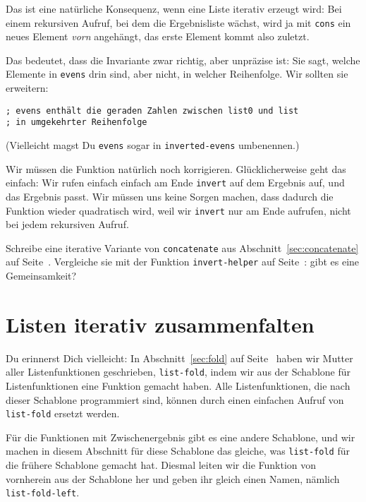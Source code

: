 Das ist eine natürliche Konsequenz, wenn eine Liste iterativ erzeugt
wird: Bei einem rekursiven Aufruf, bei dem die Ergebnisliste wächst,
wird ja mit \lstinline{cons} ein neues Element \emph{vorn} angehängt,
das erste Element kommt also zuletzt.

Das bedeutet, dass die Invariante zwar richtig, aber unpräzise ist:
Sie sagt, welche Elemente in \lstinline{evens} drin sind, aber nicht,
in welcher Reihenfolge.  Wir sollten sie erweitern:
%
\begin{lstlisting}
; evens enthält die geraden Zahlen zwischen list0 und list
; in umgekehrter Reihenfolge
\end{lstlisting}
%
(Vielleicht magst Du \lstinline{evens} sogar in
\lstinline{inverted-evens} umbenennen.)

Wir müssen die Funktion natürlich noch korrigieren.  Glücklicherweise geht das
einfach: Wir rufen einfach einfach am Ende \lstinline{invert} auf dem
Ergebnis auf, und das Ergebnis passt.  Wir müssen uns keine Sorgen
machen, dass dadurch die Funktion wieder quadratisch wird, weil wir
\lstinline{invert} nur am Ende aufrufen, nicht bei jedem rekursiven
Aufruf.

\begin{aufgabeinline}
  Schreibe eine iterative Variante von \lstinline{concatenate} aus
  Abschnitt~\ref{sec:concatenate} auf Seite~\pageref{sec:concatenate}.
  Vergleiche sie mit der Funktion \lstinline{invert-helper} auf
  Seite~\pageref{function:invert-helper}: gibt es eine Gemeinsamkeit?
\end{aufgabeinline}

\section{Listen iterativ zusammenfalten}

Du erinnerst Dich vielleicht: In Abschnitt~\ref{sec:fold} auf
Seite~\pageref{sec:fold} haben wir Mutter aller Listenfunktionen
geschrieben, \lstinline{list-fold}, indem wir aus der Schablone für
Listenfunktionen eine Funktion gemacht haben.  Alle Listenfunktionen,
die nach dieser Schablone programmiert sind, können durch einen
einfachen Aufruf von \lstinline{list-fold} ersetzt werden.

Für die Funktionen mit Zwischenergebnis gibt es eine andere Schablone,
und wir machen in diesem Abschnitt für diese Schablone das gleiche,
was \lstinline{list-fold} für die frühere Schablone gemacht hat.
Diesmal leiten wir die Funktion von vornherein aus der Schablone her
und geben ihr gleich einen Namen, nämlich \lstinline{list-fold-left}.

